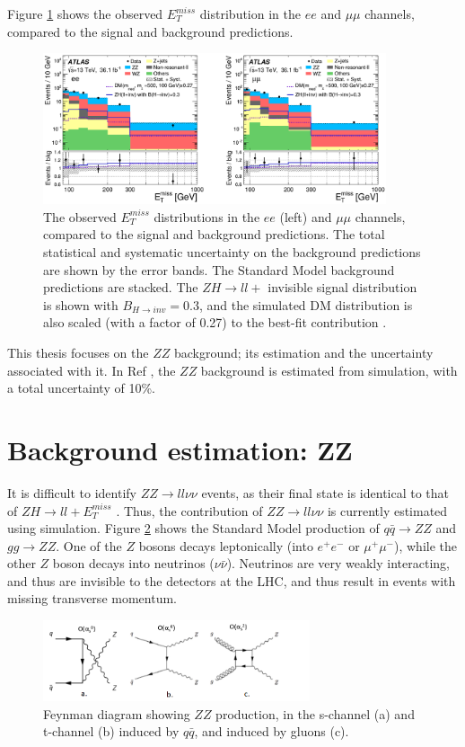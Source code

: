 \documentclass[11pt,a4paper,openright,twoside]{report}
\newcommand{\ZZ}{$ZZ\to ll\nu\nu$ }
\newcommand{\met}{$E_T^{miss}$ }
\begin{document}
Figure \ref{fig:ZH_results} shows the observed \met distribution in the $ee$ and $\mu\mu$ channels, compared to the signal and background predictions.
\begin{figure}[h]
\centering
		\includegraphics[width=0.9\textwidth]{ZH_results.png}
		\caption{The observed \met distributions in the $ee$ (left) and $\mu\mu$ channels, compared to the signal and background predictions. The total statistical and systematic uncertainty on the background predictions are shown by the error bands. The Standard Model background predictions are stacked. The $ZH\to ll+$ invisible signal distribution is shown with $B_{H\to inv}=0.3$, and the simulated DM distribution is also scaled (with a factor of 0.27) to the best-fit contribution \cite{ZH_ATLAS}.}
		\label{fig:ZH_results}
\end{figure}

This thesis focuses on the $ZZ$ background; its estimation and the uncertainty associated with it. In Ref \cite{ZH_ATLAS}, the $ZZ$ background is estimated from simulation, with a total uncertainty of 10\%.



\section{Background estimation: ZZ}
It is difficult to identify \ZZ events, as their final state is identical to that of $ZH\to ll+$\met. Thus, the contribution of \ZZ is currently estimated using simulation. Figure \ref{fig:ZZ} shows the Standard Model production of $q\bar{q}\to ZZ$ and $gg\to ZZ$. One of the $Z$ bosons decays leptonically (into $e^+e^-$ or $\mu^+\mu^-$), while the other $Z$ boson decays into neutrinos ($\nu\bar{\nu}$). Neutrinos are very weakly interacting, and thus are invisible to the detectors at the LHC, and thus result in events with missing transverse momentum.

\begin{figure}[H]
\centering
		\includegraphics[width=0.7\textwidth]{ZZ.png}
		\caption{Feynman diagram showing $ZZ$ production, in the s-channel (a) and t-channel (b) induced by $q\bar{q}$, and induced by gluons (c).}
		\label{fig:ZZ}
\end{figure}
\end{document}
